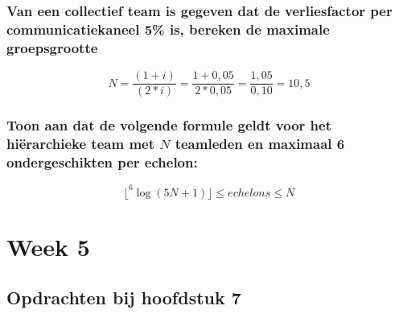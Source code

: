 \documentclass[a4paper,titlepage]{artikel1}
\begin{document}
   \subsubsection[Opdracht 3]{Van een collectief team is gegeven dat de verliesfactor per communicatiekaneel 5\% is, bereken de maximale groepsgrootte}
   \begin{displaymath}
     N=\frac{(1+i)}{(2*i)}=\frac{1+0,05}{2*0,05}=\frac{1,05}{0,10}=10,5
   \end{displaymath}

   \subsubsection[Opdracht 4]{Toon aan dat de volgende formule geldt voor het hi\"{e}rarchieke team met $N$ teamleden en maximaal 6 ondergeschikten per echelon:}
   \begin{displaymath}
     \lfloor^6\log{(5N+1)}\rfloor\leq echelons\leq N
   \end{displaymath}

   \section{Week 5}
   \subsection{Opdrachten bij hoofdstuk 7}
\end{document}
